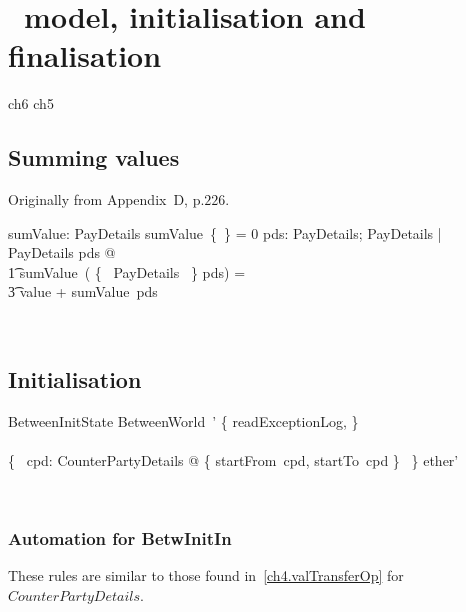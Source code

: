 \chapter{\Betw\ model, initialisation and finalisation}\label{ch6}

\begin{zsection}
  \SECTION ch6 \parents ch5
\end{zsection}

\section{Summing values}\label{ch6.sumValue}

Originally from Appendix~D, p.$226$.
\begin{LADef}
\begin{axdef}
   sumValue: \finset PayDetails \fun \nat
\where
      sumValue~\{~\} = 0
   \also
      \forall pds: \finset PayDetails; PayDetails | \theta PayDetails \notin pds @ \\
          \t1 sumValue~( \{~ \theta PayDetails ~\} \cup pds) = \\
                \t3 value + sumValue~pds
\end{axdef}~\end{LADef}

\section{Initialisation}\label{ch6.init}

\begin{LSDef}
\begin{schema}{BetweenInitState}
  BetweenWorld~' \where \{ readExceptionLog, \bot \}
  \\ %
  \cup
  \\ %
  \bigcup \{~ cpd: CounterPartyDetails @ \{ startFrom~cpd, startTo~cpd
  \} ~\}
  \also %
  \subseteq ether'
\end{schema}~\end{LSDef}

\subsection*{Automation for BetwInitIn}

These rules are similar to those found in~\ref{ch4.valTransferOp} for $CounterPartyDetails$.
%

